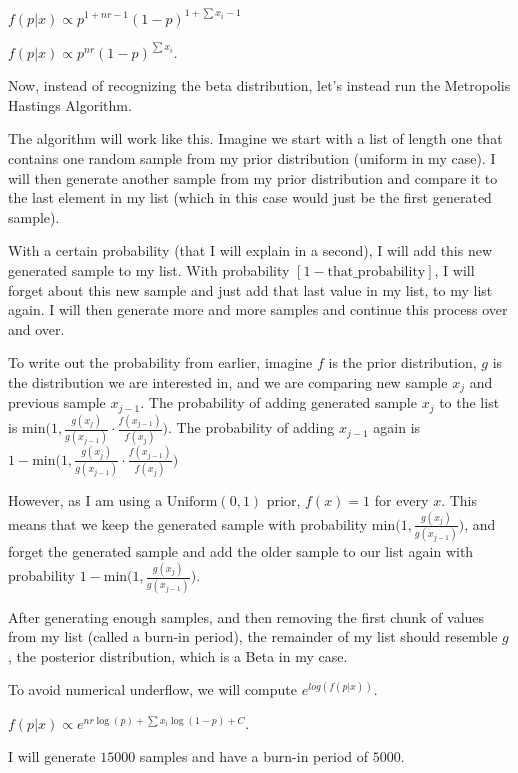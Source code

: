 \documentclass[
  letterpaper,
  DIV=11,
  numbers=noendperiod]{scrreprt}
\begin{document}
\(f(p | x) \propto p^{1 + nr - 1} (1-p)^{1 + \sum x_i - 1}\)

\(f(p | x) \propto p^{nr} (1-p)^{\sum x_i}\).

Now, instead of recognizing the beta distribution, let's instead run the
Metropolis Hastings Algorithm.

The algorithm will work like this. Imagine we start with a list of
length one that contains one random sample from my prior distribution
(uniform in my case). I will then generate another sample from my prior
distribution and compare it to the last element in my list (which in
this case would just be the first generated sample).

With a certain probability (that I will explain in a second), I will add
this new generated sample to my list. With probability
\([1 - \text{that\_probability}]\), I will forget about this new sample
and just add that last value in my list, to my list again. I will then
generate more and more samples and continue this process over and over.

To write out the probability from earlier, imagine \(f\) is the prior
distribution, \(g\) is the distribution we are interested in, and we are
comparing new sample \(x_j\) and previous sample \(x_{j-1}\). The
probability of adding generated sample \(x_j\) to the list is
\(\text{min}\Big(1, \frac{g(x_j)}{g(x_{j-1})} \cdot \frac{f(x_{j-1})}{f(x_j)}\Big)\).
The probability of adding \(x_{j-1}\) again is
\(1 - \text{min}\Big(1,  \frac{g(x_j)}{g(x_{j-1})} \cdot \frac{f(x_{j-1})}{f(x_j)} \Big)\)

However, as I am using a \(\text{Uniform}(0,1)\) prior, \(f(x) = 1\) for
every \(x\). This means that we keep the generated sample with
probability \(\text{min}\Big(1, \frac{g(x_j)}{g(x_{j-1})}\Big)\), and
forget the generated sample and add the older sample to our list again
with probability
\(1 - \text{min}\Big(1, \frac{g(x_j)}{g(x_{j-1})} \Big)\).

After generating enough samples, and then removing the first chunk of
values from my list (called a burn-in period), the remainder of my list
should resemble \(g\), the posterior distribution, which is a Beta in my
case.

To avoid numerical underflow, we will compute \(e^{log(f(p | x))}\).

\(f(p | x) \propto e^{ nr \log (p) + {\sum x_i} \log (1-p) + C}\).

I will generate \(15000\) samples and have a burn-in period of \(5000\).
\end{document}
